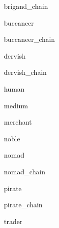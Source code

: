 \documentclass[letterpaper,serif]{module}
\begin{document}
\begin{newmonster}{brigand_chain}\end{newmonster}

\begin{newmonster}{buccaneer}\end{newmonster}

\begin{newmonster}{buccaneer_chain}\end{newmonster}

\begin{newmonster}{dervish}\end{newmonster}

\begin{newmonster}{dervish_chain}\end{newmonster}

\begin{newmonster}{human}\end{newmonster}

\begin{newmonster}{medium}\end{newmonster}

\begin{newmonster}{merchant}\end{newmonster}

\begin{newmonster}{noble}\end{newmonster}

\begin{newmonster}{nomad}\end{newmonster}

\begin{newmonster}{nomad_chain}\end{newmonster}

\begin{newmonster}{pirate}\end{newmonster}

\begin{newmonster}{pirate_chain}\end{newmonster}

\begin{newmonster}{trader}\end{newmonster}
\end{document}
